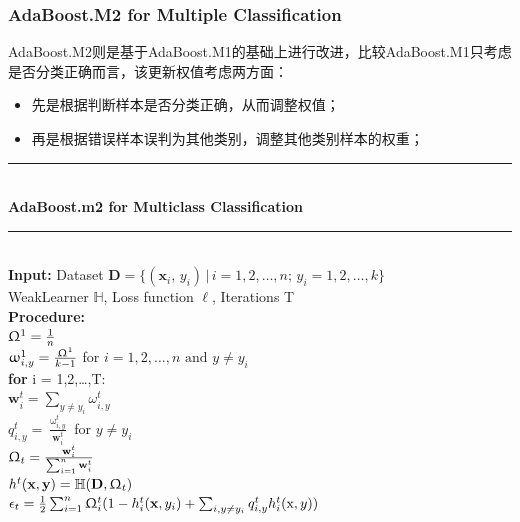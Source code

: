 \documentclass[a4paper]{article}
\begin{document}
		\subsubsection{AdaBoost.M2 for Multiple Classification}
			AdaBoost.M2则是基于AdaBoost.M1的基础上进行改进，比较AdaBoost.M1只考虑是否分类正确而言，该更新权值考虑两方面：
			\begin{itemize}
				\item 先是根据判断样本是否分类正确，从而调整权值；
				\item 再是根据错误样本误判为其他类别，调整其他类别样本的权重；
			\end{itemize}
			\noindent\rule[0.1\baselineskip]{\textwidth}{0.75pt}\\
			\textbf{AdaBoost.m2 for Multiclass Classification}\\
			\noindent\rule[0.1\baselineskip]{\textwidth}{0.5pt}\\
			\textbf{Input:} Dataset $\textbf{D} = \{(\mathbf{x}_i,\,y_i)\,|\,i = 1, 2,\dots, n;\, y_i = 1, 2, \dots, k\}$\\
			\hspace*{32pt} WeakLearner $\mathbb{H}$, Loss function $\ell$, Iterations T\\
			\textbf{Procedure:} \\
					\hspace*{32pt}  $\Upomega^1 = \frac{1}{n}$\\
					\hspace*{32pt}	$\upomega_{i,y}^{1} = \frac{\Upomega^1}{k-1}$ for $i = 1,2,\dots,n\,\,\text{and}\,\, y\neq y_i$\\
					\hspace*{32pt}	\textbf{for} i = 1,2,\dots,T: \\
					\hspace*{48pt}	$\textbf{w}_i^t = \sum_{y\neq y_i}\omega_{i,y}^t$\\
					\hspace*{48pt}	$q_{i,y}^t = \frac{\upomega_{i,y}^{t}}{\textbf{w}_i^t}$ for $y\neq y_i$\\
					\hspace*{48pt}	$\Upomega_t = \frac{\textbf{w}_i^t}{\sum_{i=1}^{n}\textbf{w}_i^t}$\\
					\hspace*{48pt}	$h^t(\textbf{x}, \textbf{y}) = \mathbb{H}(\textbf{D}, \Upomega_t)$\\
					\hspace*{48pt}	$\epsilon_t = \frac{1}{2}\sum_{i=1}^{n}\Upomega^t_i(1-h^t_i(\textbf{x},y_i)+\sum_{i,y\neq y_i}q_{i,y}^th^t_i(\text{x},y))$\\
\end{document}
